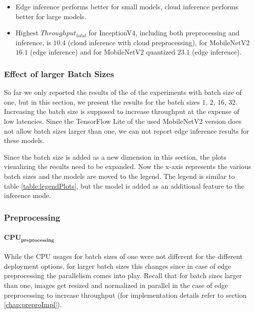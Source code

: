 {\begin{itemize}
\end{itemize}
\begin{itemize}[leftmargin=4em]
 \renewcommand{\labelitemi}{$\Rightarrow$}
 \item Edge inference performs better for small models, cloud inference performs better for large models.
 \item Highest $Throughput_{total}$ for InceptionV4, including both preprocessing and inference, is $10.4$ (cloud inference with cloud preprocessing), for MobileNetV2 $16.1$ (edge inference) and for MobileNetV2 quantized $23.1$ (edge inference).
\end{itemize}
}

\subsubsection{Effect of larger Batch Sizes}
\label{chap:resultsBatchSize}
So far we only reported the results of the of the experiments with batch size of one, but in this section, we present the results for the batch sizes $1$, $2$, $16$, $32$.
Increasing the batch size is supposed to increase throughput at the expense of low latencies.
Since the TensorFlow Lite of the used MobileNetV2 version does not allow batch sizes larger than one, we can not report edge inference results for these models.

Since the batch size is added as a new dimension in this section, the plots visualizing the results need to be expanded.
Now the x-axis represents the various batch sizes and the models are moved to the legend. 
The legend is similar to table \ref{table:legendPlots}, but the model is added as an additional feature to the inference mode.
\subsubsection{Preprocessing}

\paragraph{$\mathbf{CPU_{preprocessing}}$}
While the CPU usages for batch sizes of one were not different for the different deployment options, for larger batch sizes this changes since in case of edge preprocessing the parallelism comes into play.
Recall that for batch sizes larger than one, images get resized and normalized in parallel in the case of edge preprocessing to increase throughput (for implementation details refer to section \ref{chap:preproImpl}).

